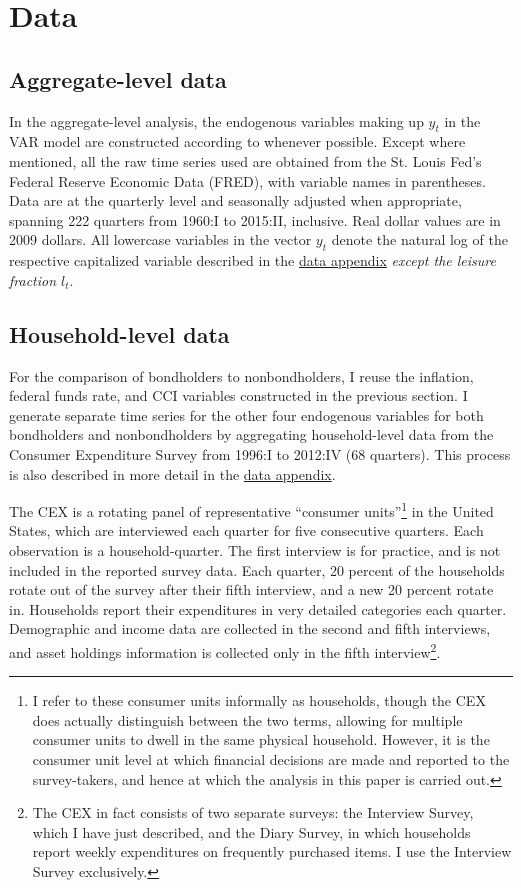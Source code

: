 \section{Data}

\subsection{Aggregate-level data}
\label{aggregate-data}

In the aggregate-level analysis, the endogenous variables making up $y_t$ in the VAR model are constructed according to \cite{collard11} whenever possible. Except where mentioned, all the raw time series used are obtained from the St. Louis Fed's Federal Reserve Economic Data (FRED), with variable names in parentheses. Data are at the quarterly level and seasonally adjusted when appropriate, spanning 222 quarters from 1960:I to 2015:II, inclusive. Real dollar values are in 2009 dollars. All lowercase variables in the vector $y_t$ denote the natural log of the respective capitalized variable described in the \hyperref[aggregate-data-appendix]{data appendix} \textit{except the leisure fraction $l_t$}.



\subsection{Household-level data}
\label{household-data}

For the comparison of bondholders to nonbondholders, I reuse the inflation, federal funds rate, and CCI variables constructed in the previous section. I generate separate time series for the other four endogenous variables for both bondholders and nonbondholders by aggregating household-level data from the Consumer Expenditure Survey from 1996:I to 2012:IV (68 quarters). This process is also described in more detail in the \hyperref[household-data-appendix]{data appendix}.

The CEX is a rotating panel of representative ``consumer units''\footnote{I refer to these consumer units informally as households, though the CEX does actually distinguish between the two terms, allowing for multiple consumer units to dwell in the same physical household. However, it is the consumer unit level at which financial decisions are made and reported to the survey-takers, and hence at which the analysis in this paper is carried out.} in the United States, which are interviewed each quarter for five consecutive quarters. Each observation is a household-quarter. The first interview is for practice, and is not included in the reported survey data. Each quarter, 20 percent of the households rotate out of the survey after their fifth interview, and a new 20 percent rotate in. Households report their expenditures in very detailed categories each quarter. Demographic and income data are collected in the second and fifth interviews, and asset holdings information is collected only in the fifth interview\footnote{The CEX in fact consists of two separate surveys: the Interview Survey, which I have just described, and the Diary Survey, in which households report weekly expenditures on frequently purchased items. I use the Interview Survey exclusively.}.

